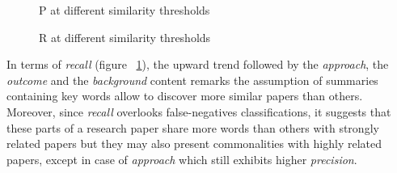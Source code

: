 \begin{figure}[!htb]\centering
   \begin{minipage}{0.49\textwidth}
     \caption{P at different similarity thresholds}\label{fig:precision}
   \end{minipage}
   \begin {minipage}[c]{0.49\textwidth}
     \caption{R at different similarity thresholds}\label{fig:recall}
   \end{minipage}
\end{figure}

In terms of \textit{recall} (figure ~\ref{fig:recall}), the upward trend followed by the \textit{approach}, the \textit{outcome} and the \textit{background} content remarks the assumption of summaries containing key words allow to discover more similar papers than others. Moreover, since \textit{recall} overlooks false-negatives classifications, it suggests that these parts of a research paper share more words than others with strongly related papers but they may also present commonalities with highly related papers, except in case of \textit{approach} which still exhibits higher \textit{precision}.

